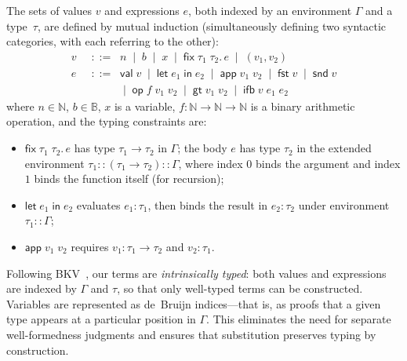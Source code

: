 \begin{definition}
\label{def:pcfv-terms}
The sets of values $v$ and expressions $e$, both indexed by an environment
$\Gamma$ and a type~$\tau$, are defined by mutual induction
(simultaneously defining two syntactic categories, with each referring to
the other):
\begin{align*}
  v &\;\;::=\;\;
    n \;\mid\; b \;\mid\; x \;\mid\;
    \mathsf{fix}\;\tau_1\;\tau_2.\, e \;\mid\;
    (v_1, v_2) \\[3pt]
  e &\;\;::=\;\;
    \mathsf{val}\;v \;\mid\;
    \mathsf{let}\;e_1\;\mathsf{in}\;e_2 \;\mid\;
    \mathsf{app}\;v_1\;v_2 \;\mid\;
    \mathsf{fst}\;v \;\mid\;
    \mathsf{snd}\;v \\
    &\;\;\phantom{::=}\;\;{}\mid\;
    \mathsf{op}\;f\;v_1\;v_2 \;\mid\;
    \mathsf{gt}\;v_1\;v_2 \;\mid\;
    \mathsf{ifb}\;v\;e_1\;e_2
\end{align*}
where $n \in \mathbb{N}$, $b \in \mathbb{B}$, $x$ is a variable, $f :
\mathbb{N} \to \mathbb{N} \to \mathbb{N}$ is a binary arithmetic
operation, and the typing constraints are:
\begin{itemize}
  \item $\mathsf{fix}\;\tau_1\;\tau_2.\, e$ has type $\tau_1 \to \tau_2$ in
    $\Gamma$; the body $e$ has type $\tau_2$ in the extended environment
    $\tau_1 :: (\tau_1 \to \tau_2) :: \Gamma$, where index $0$ binds the
    argument and index $1$ binds the function itself (for recursion);
  \item $\mathsf{let}\;e_1\;\mathsf{in}\;e_2$ evaluates $e_1 : \tau_1$,
    then binds the result in $e_2 : \tau_2$ under environment
    $\tau_1 :: \Gamma$;
  \item $\mathsf{app}\;v_1\;v_2$ requires $v_1 : \tau_1 \to \tau_2$ and
    $v_2 : \tau_1$.
\end{itemize}
\end{definition}

\begin{remark}
\label{rem:intrinsic-typing}
Following BKV~\cite{BKV2009}, our terms are \emph{intrinsically typed}:
both values and expressions are indexed by $\Gamma$ and $\tau$, so
that only well-typed terms can be constructed.  Variables are represented
as de~Bruijn indices---that is, as proofs that a given type appears at a
particular position in $\Gamma$.  This eliminates the need for
separate well-formedness judgments and ensures that substitution preserves
typing by construction.
\end{remark}

